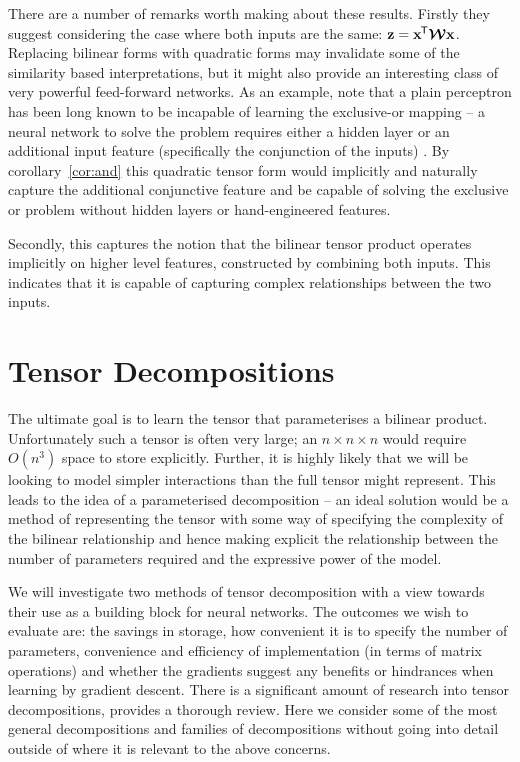 {There are a number of remarks worth making about these results. Firstly they suggest considering
the case where both inputs are the same: \(\mathbf{z} = \mathbf{x}^{\mkern-1.5mu\mathsf{T}}\bm{\mathcal{W}}\mathbf{x}\). Replacing
bilinear forms with quadratic forms may invalidate some of the similarity based interpretations,
but it might also provide an interesting class of very powerful feed-forward networks. As an example,
note that a plain perceptron has been long known to be incapable of learning the exclusive-or
mapping \autocite{Minsky1969} -- a neural network to solve the problem requires either a hidden layer
or an additional input feature (specifically the conjunction of the inputs) \autocite{Rumelhart1986}.
By corollary~\ref{cor:and} this quadratic tensor form would implicitly and naturally capture the
additional conjunctive feature and be capable of solving the exclusive or problem without hidden
layers or hand-engineered features.

Secondly, this captures the notion that the bilinear tensor product operates implicitly on higher
level features, constructed by combining both inputs. This indicates that it is capable of capturing
complex relationships between the two inputs.

\section{Tensor Decompositions}
The ultimate goal is to learn the tensor that parameterises a bilinear product. Unfortunately
such a tensor is often very large; an \(n \times n \times n\) would require \(O(n^3)\) space
to store explicitly. Further,
it is highly likely that we will be looking to model simpler interactions than the full tensor
might represent. This leads to the idea of a parameterised decomposition -- an ideal solution
would be a method of representing the tensor with some way of specifying the complexity of the
bilinear relationship and hence making explicit the relationship between the number of parameters
required and the expressive power of the model. 

We will investigate two methods of tensor decomposition with a view towards their use as a building
block for neural networks. The outcomes we wish to evaluate are: the savings in storage, how
convenient it is to specify the number of parameters, convenience and efficiency of implementation
(in terms of matrix operations) and whether the gradients suggest any benefits or hindrances when
learning by gradient descent. There is a significant amount of research into tensor decompositions,
\autocite{Kolda2009} provides a thorough review. Here we consider some of the most general
decompositions and families of decompositions without going into detail outside of where it is
relevant to the above concerns.

}
